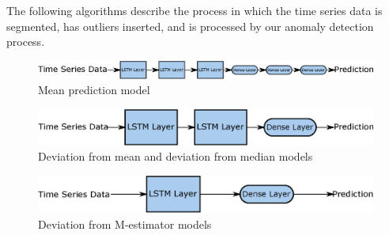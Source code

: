 \documentclass[conference]{IEEEtran}
\begin{document}
The following algorithms describe the process in which the time series data is segmented, has outliers inserted, and is processed by our anomaly detection process.

   
\begin{figure}
	\centering
	\includegraphics[width = 1 \linewidth]{model1.eps}
	\caption{Mean prediction model}
	\label{label1}
\end{figure}

\begin{figure}
	\centering
	\includegraphics[width = 1 \linewidth]{model2.eps}
	\caption{Deviation from mean and deviation from median models}
	\label{label2}
\end{figure} 
 
\begin{figure}
	\centering
	\includegraphics[width = 1 \linewidth]{model3.eps}
	\caption{Deviation from M-estimator models}
	\label{label3}
\end{figure} 
\end{document}
